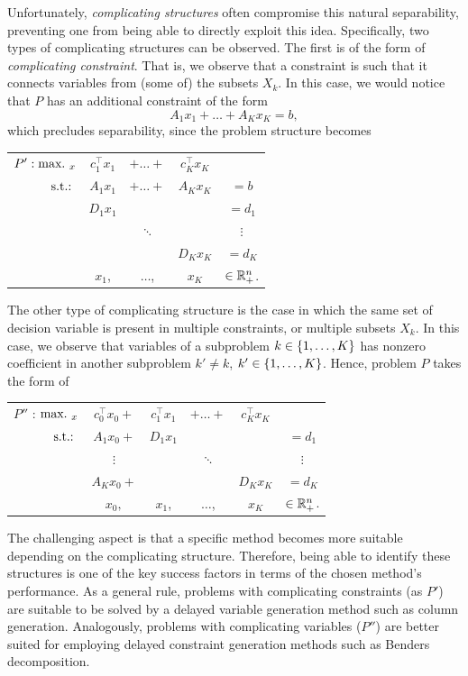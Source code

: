 Unfortunately, \emph{complicating structures} often compromise this natural separability, preventing one from being able to directly exploit this idea. Specifically, two types of complicating structures can be observed. The first is of the form of \emph{complicating constraint}. That is, we observe that a constraint is such that it connects variables from (some of) the subsets $X_k$. In this case, we would notice that $P$ has an additional constraint of the form
%
\begin{equation*}
	A_1x_1 + \dots + A_Kx_K = b,
\end{equation*}
%
which precludes separability, since the problem structure becomes
% 
\begin{center}
	\begin{tabular}{rcccc}
	    $P':  \mathop{\text{max.~}}_x$ & $c_1^\top x_1$ & $+\dots+$ & $c_K^\top x_K$ & \\
	            $\mathop{\text{s.t.:~}}$  & $A_1x_1$ & $+\dots+$ & $A_Kx_K$ & $=b$ \\
	                   & $D_1x_1$ &           &          & $= d_1$ \\
	                   &          & $\ddots$  &          & $\vdots$ \\
	                   &          &           & $D_Kx_K$ & $= d_K$ \\
	                   &  $x_1$,  & $\dots$,  & $x_K$ & $\in \mathbb{R}^n_+$. 
	\end{tabular}
\end{center}

The other type of complicating structure is the case in which the same set of decision variable is present in multiple constraints, or multiple subsets $X_k$. In this case, we observe that variables of a subproblem $k \in \left\{ 1,\dots,K \right \}$ has nonzero coefficient in another subproblem $k' \neq k$, $k' \in \left\{ 1,\dots,K \right \}$. Hence, problem $P$ takes the form of
%
\begin{center}
	\begin{tabular}{rccccc}
	$P''$ : $\mathop{\text{max.~}}_x$ & $c_0^\top x_0 +$ &  $c_1^\top x_1$ & $+\dots+$ & $c_K^\top x_K$ & \\
        $\mathop{\text{s.t.:~}}$  & $A_1x_0+$ & $D_1x_1$ &           &          & $= d_1$ \\
               & $\vdots$  &          & $\ddots$  &          & $\vdots$ \\
               & $A_Kx_0+$ &          &           & $D_Kx_K$ & $= d_K$ \\
               & $x_0,$    &  $x_1$,  & $\dots$,  & $x_K$    & $\in \mathbb{R}^n_+$. 
	\end{tabular}
\end{center}
%
The challenging aspect is that a specific method becomes more suitable depending on the complicating structure. Therefore, being able to identify these structures is one of the key success factors in terms of the chosen method's performance. As a general rule, problems with complicating constraints (as $P'$) are suitable to be solved by a delayed variable generation method such as column generation. Analogously, problems with complicating variables ($P''$) are better suited for employing delayed constraint generation methods such as Benders decomposition. 

